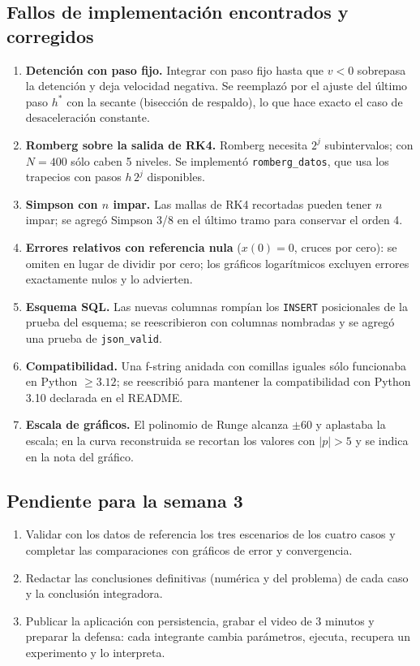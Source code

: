 \documentclass[11pt,letterpaper]{article}
\begin{document}
\subsection{Fallos de implementación encontrados y corregidos}
\begin{enumerate}
\item \textbf{Detención con paso fijo.} Integrar con paso fijo hasta que $v<0$ sobrepasa la detención y deja velocidad negativa. Se reemplazó por el ajuste del último paso $h^*$ con la secante (bisección de respaldo), lo que hace exacto el caso de desaceleración constante.
\item \textbf{Romberg sobre la salida de RK4.} Romberg necesita $2^j$ subintervalos; con $N=400$ sólo caben 5 niveles. Se implementó \texttt{romberg\_datos}, que usa los trapecios con pasos $h\,2^j$ disponibles.
\item \textbf{Simpson con $n$ impar.} Las mallas de RK4 recortadas pueden tener $n$ impar; se agregó Simpson 3/8 en el último tramo para conservar el orden 4.
\item \textbf{Errores relativos con referencia nula} ($x(0)=0$, cruces por cero): se omiten en lugar de dividir por cero; los gráficos logarítmicos excluyen errores exactamente nulos y lo advierten.
\item \textbf{Esquema SQL.} Las nuevas columnas rompían los \texttt{INSERT} posicionales de la prueba del esquema; se reescribieron con columnas nombradas y se agregó una prueba de \texttt{json\_valid}.
\item \textbf{Compatibilidad.} Una f-string anidada con comillas iguales sólo funcionaba en Python $\ge3.12$; se reescribió para mantener la compatibilidad con Python 3.10 declarada en el README.
\item \textbf{Escala de gráficos.} El polinomio de Runge alcanza $\pm60$ y aplastaba la escala; en la curva reconstruida se recortan los valores con $|p|>5$ y se indica en la nota del gráfico.
\end{enumerate}

\subsection{Pendiente para la semana 3}
\begin{enumerate}
\item Validar con los datos de referencia los tres escenarios de los cuatro casos y completar las comparaciones con gráficos de error y convergencia.
\item Redactar las conclusiones definitivas (numérica y del problema) de cada caso y la conclusión integradora.
\item Publicar la aplicación con persistencia, grabar el video de 3 minutos y preparar la defensa: cada integrante cambia parámetros, ejecuta, recupera un experimento y lo interpreta.
\end{enumerate}
\end{document}
